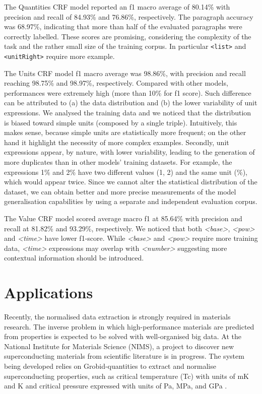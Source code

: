 \documentclass[sigconf]{acmart}
\begin{document}
The Quantities CRF model reported an f1 macro average of 80.14\% with precision and recall of 84.93\% and 76.86\%, respectively. The paragraph accuracy was 68.97\%, indicating that more than half of the evaluated paragraphs were correctly labelled. These scores are promising, considering the complexity of the task and the rather small size of the training corpus. In particular \texttt{<list>} and \texttt{<unitRight>} require more example. 

The Units CRF model f1 macro average was 98.86\%, with precision and recall reaching 98.75\% and 98.97\%, respectively. Compared with other models, performances were extremely high (more than 10\% for f1 score). 
Such difference can be attributed to (a) the data distribution and (b) the lower variability of unit expressions. We analysed the training data and we noticed that the distribution is biased toward simple units (composed by a single triple). Intuitively, this makes sense, because simple units are statistically more frequent; on the other hand it highlight the necessity of more complex examples. 
Secondly, unit expressions appear, by nature, with lower variability, leading to the generation of more duplicates than in other models' training datasets. For example, the expressions 1\% and 2\% have two different values (1, 2) and the same unit (\%), which would appear twice. 
Since we cannot alter the statistical distribution of the dataset, we can obtain better and more precise measurements of the model generalisation capabilities by using a separate and independent evaluation corpus. 

The Value CRF model scored average macro f1 at 85.64\% with precision and recall at 81.82\% and 93.29\%, respectively.
We noticed that both \textit{<base>}, \textit{<pow>} and \textit{<time>} have lower f1-score. While \textit{<base>} and \textit{<pow>} require more training data, \textit{<time>} expressions may overlap with \textit{<number>} suggesting more contextual information should be introduced. 


\section{Applications}
\label{sec:use_cases}
Recently, the normalised data extraction is strongly required in materials research. The inverse problem in which high-performance materials are predicted from properties is expected to be solved with well-organised big data. At the National Institute for Materials Science (NIMS), a project to discover new superconducting materials from scientific literature is in progress. The system being developed relies on Grobid-quantities to extract and normalise superconducting properties, such as critical temperature (Tc) with units of mK and K and critical pressure expressed with units of Pa, MPa, and GPa \cite{foppiano2019proposal}. 
\end{document}
